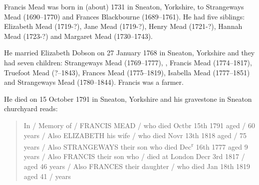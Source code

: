 
Francis Mead was born in (about) 1731 in Sneaton, Yorkshire, to Strangeways Mead (1690--1770) and Frances Blackbourne (1689--1761). He had five siblings: Elizabeth Mead (1719-?), Jane Mead (1719-?), Henry Mead (1721-?), Hannah Mead (1723-?) and Margaret Mead (1730--1743). 

He married Elizabeth Dobson on 27 January 1768 in Sneaton, Yorkshire and they had seven children:  Strangeways Mead (1769--1777), , Francis Mead (1774--1817), Truefoot Mead (?--1843), Frances Mead (1775--1819), Isabella Mead (1777--1851) and Strangeways Mead (1780--1844). Francis was a farmer.

He died on 15 October 1791 in Sneaton, Yorkshire \cite{FMeadDeath} and his gravestone in Sneaton churchyard reads:

\begin{quotation}
In / Memory of / FRANCIS MEAD / who died Octbr 15th 1791 aged / 60 years / Also ELIZABETH his wife / who died Novr 13th 1818 aged / 75 years / Also STRANGEWAYS their son who died Dec\textsuperscript{r} 16th 1777 aged 9 years / Also FRANCIS their son who / died at London Decr 3rd 1817 / aged 46 years / Also FRANCES their daughter / who died Jan 18th 1819 aged 41 / years
\end{quotation}
